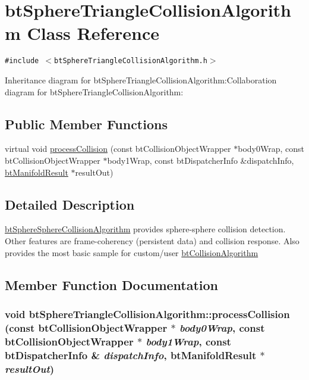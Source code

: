 \hypertarget{classbt_sphere_triangle_collision_algorithm}{
\section{btSphereTriangleCollisionAlgorithm Class Reference}
\label{classbt_sphere_triangle_collision_algorithm}
}
{\tt \#include $<$btSphereTriangleCollisionAlgorithm.h$>$}

Inheritance diagram for btSphereTriangleCollisionAlgorithm:Collaboration diagram for btSphereTriangleCollisionAlgorithm:\subsection*{Public Member Functions}
\begin{CompactItemize}
\item 
virtual void \hyperlink{classbt_sphere_triangle_collision_algorithm_f6de517d0a45abb91df4f61c5867c8f1}{processCollision} (const btCollisionObjectWrapper $\ast$body0Wrap, const btCollisionObjectWrapper $\ast$body1Wrap, const btDispatcherInfo \&dispatchInfo, \hyperlink{classbt_manifold_result}{btManifoldResult} $\ast$resultOut)
\end{CompactItemize}


\subsection{Detailed Description}
\hyperlink{classbt_sphere_sphere_collision_algorithm}{btSphereSphereCollisionAlgorithm} provides sphere-sphere collision detection. Other features are frame-coherency (persistent data) and collision response. Also provides the most basic sample for custom/user \hyperlink{classbt_collision_algorithm}{btCollisionAlgorithm} 

\subsection{Member Function Documentation}
\hypertarget{classbt_sphere_triangle_collision_algorithm_f6de517d0a45abb91df4f61c5867c8f1}{
\subsubsection[processCollision]{\setlength{\rightskip}{0pt plus 5cm}void btSphereTriangleCollisionAlgorithm::processCollision (const btCollisionObjectWrapper $\ast$ {\em body0Wrap}, \/  const btCollisionObjectWrapper $\ast$ {\em body1Wrap}, \/  const btDispatcherInfo \& {\em dispatchInfo}, \/  {\bf btManifoldResult} $\ast$ {\em resultOut})}}
\label{classbt_sphere_triangle_collision_algorithm_f6de517d0a45abb91df4f61c5867c8f1}




